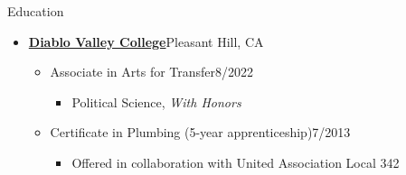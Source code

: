\documentclass[12pt]{resume} %
\begin{document}
\begin{rSection}{Education}
\begin{itemize}[leftmargin=0em, itemsep=0pt]
\begin{itemize}[leftmargin=1em, itemsep=0pt]
    \item[] Associate in Arts for Transfer\hfill{}8/2022
    \begin{itemize}[leftmargin=1em, itemsep=0pt]
        \item[] Sociology, \textit{With Honors}
        \item[] Liberal Arts: Behavioral Science \& Social Science, \textit{With Honors}
    \end{itemize}
    \item[] \href{https://www.losmedanos.edu/honors/prog.aspx}{Honors Scholar} (the college’s highest distinction)
\end{itemize}
\vspace{12pt}
\item[] \textbf{\href{https://www.dvc.edu/}{Diablo Valley College}}\hfill{}Pleasant Hill, CA
\begin{itemize}[leftmargin=1em, itemsep=0pt]
    \item[] Associate in Arts for Transfer\hfill{}8/2022
    \begin{itemize}[leftmargin=1em, itemsep=0pt]
        \item[] Political Science, \textit{With Honors}
    \end{itemize}
    \item[] Certificate in Plumbing (5-year apprenticeship)\hfill{}7/2013
    \begin{itemize}[leftmargin=1em, itemsep=0pt]
        \item[] Offered in collaboration with United Association Local 342
    \end{itemize}
\end{itemize}
\end{itemize}

\end{rSection}
\end{document}
